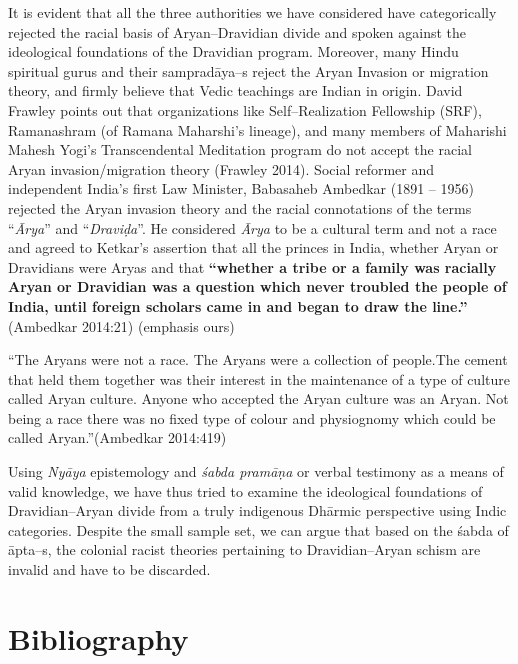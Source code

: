 It is evident that all the three authorities we have considered have categorically rejected the racial basis of Aryan–Dravidian divide and spoken against the ideological foundations of the Dravidian program. Moreover, many Hindu spiritual gurus and their sampradāya–s reject the Aryan Invasion or migration theory, and firmly believe that Vedic teachings are Indian in origin. David Frawley points out that organizations like Self–Realization Fellowship (SRF), Ramanashram (of Ramana Maharshi’s lineage), and many members of Maharishi Mahesh Yogi’s Transcendental Meditation program do not accept the racial Aryan invasion/migration theory (Frawley 2014). Social reformer and independent India’s first Law Minister, Babasaheb Ambedkar (1891 – 1956) rejected the Aryan invasion theory and the racial connotations of the terms “\textit{Ārya}” and “\textit{Draviḍa}”. He considered \textit{Ārya} to be a cultural term and not a race and agreed to Ketkar’s assertion that all the princes in India, whether Aryan or Dravidians were Aryas and that \textbf{“whether a tribe or a family was racially Aryan or Dravidian was a question which never troubled the people of India, until foreign scholars came in and began to draw the line.”} (Ambedkar 2014:21) (emphasis ours)

\begin{myquote}
“The Aryans were not a race. The Aryans were a collection of people.The cement that held them together was their interest in the maintenance of a type of culture called Aryan culture. Anyone who accepted the Aryan culture was an Aryan. Not being a race there was no fixed type of colour and physiognomy which could be called Aryan.”(Ambedkar 2014:419)
\end{myquote}

Using \textit{Nyāya} epistemology and \textit{śabda pramāṇa} or verbal testimony as a means of valid knowledge, we have thus tried to examine the ideological foundations of Dravidian–Aryan divide from a truly indigenous Dhārmic perspective using Indic categories. Despite the small sample set, we can argue that based on the śabda of āpta–s, the colonial racist theories pertaining to Dravidian–Aryan schism are invalid and have to be discarded.

\newpage

\section*{Bibliography}

